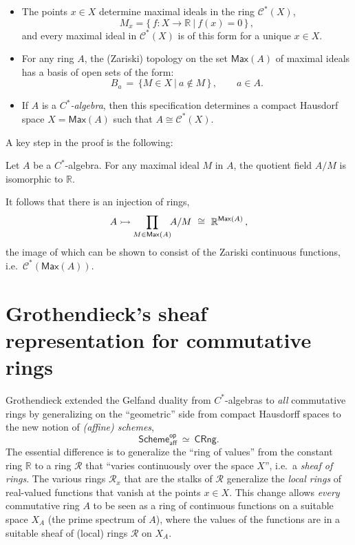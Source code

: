 \documentclass[lambek.tex]{subfiles}
\begin{document}
\begin{itemize}
\item The points  $x\in X$ determine maximal ideals in the ring $\mathcal{C}^*(X)$,
\[
M_x = \{\, f : X\to \mathbb{R}\ |\ f(x) = 0\, \}\,,
\]
and every maximal ideal in $\mathcal{C}^*(X)$ is of this form for a unique $x\in X$.

\item For any ring $A$, the (Zariski) topology on the set $\mathsf{Max}(A)$ of maximal ideals has a basis of open sets of the form:
\[
B_a\, =\, \{M \in X\ |\ a\notin M\, \}\, ,\qquad a\in A.
\]

\item If $A$ is a \emph{$C^*$-algebra}, then this specification  determines a compact Hausdorf space $X = \mathsf{Max}(A)$ such that $A\cong \mathcal{C}^*(X)$.
\end{itemize}

A key step in the proof is the following:
%
 \begin{theorem*}
 Let $A$ be a $C^*$-algebra.  For any maximal ideal $M$ in $A$, the quotient field 
 $A/M$ is isomorphic to  $\mathbb{R}$. 
    \end{theorem*}
%   
It follows that there is an injection of rings,
$$A \mono \prod_{M\in \mathsf{Max}(A)}\!\!A/M\ \cong\ \mathbb{R}^{\mathsf{Max}(A)}\,,$$
the image of which  can be shown to consist of the Zariski continuous functions, i.e.\  $\mathcal{C}^*(\mathsf{Max}(A))$.



\section{Grothendieck's sheaf representation for commutative rings}

Grothendieck extended the Gelfand duality from $C^*$-algebras to \emph{all} commutative rings by generalizing on the ``geometric'' side from compact Hausdorff spaces to the new notion of \emph{(affine) schemes},
 \[
\mathsf{Scheme}_\mathsf{aff}^\mathsf{op}\ \simeq\ \mathsf{CRng}.
 \]
The essential difference is to generalize the ``ring of values'' from the constant ring $\mathbb{R}$ to a ring $\mathcal{R}$ that ``varies continuously over the space $X$'', i.e.\ a \emph{sheaf of rings}.   
The various rings $\mathcal{R}_x$ that are the stalks of $\mathcal{R}$ generalize the \emph{local rings} of real-valued functions that vanish at the points $x\in X$.
This change allows \emph{every} commutative ring $A$ to be seen as a ring of continuous functions on a suitable space $X_A$ (the prime spectrum of $A$), where the values of the functions are in a suitable sheaf of (local) rings $\mathcal{R}$ on $X_A$.
\end{document}
